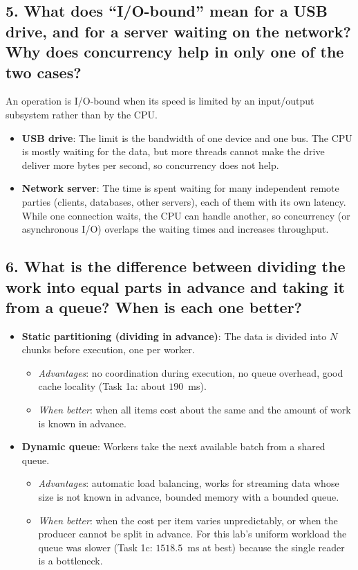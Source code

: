 \documentclass[11pt,a4paper]{article}
\begin{document}
\subsection{5. What does ``I/O-bound'' mean for a USB drive, and for a server waiting on the network? Why does concurrency help in only one of the two cases?}
An operation is I/O-bound when its speed is limited by an input/output subsystem rather than by the CPU.
\begin{itemize}
    \item \textbf{USB drive}: The limit is the bandwidth of one device and one bus. The CPU is mostly waiting for the data, but more threads cannot make the drive deliver more bytes per second, so concurrency does not help.
    \item \textbf{Network server}: The time is spent waiting for many independent remote parties (clients, databases, other servers), each of them with its own latency. While one connection waits, the CPU can handle another, so concurrency (or asynchronous I/O) overlaps the waiting times and increases throughput.
\end{itemize}

\subsection{6. What is the difference between dividing the work into equal parts in advance and taking it from a queue? When is each one better?}
\begin{itemize}
    \item \textbf{Static partitioning (dividing in advance)}: The data is divided into $N$ chunks before execution, one per worker.
    \begin{itemize}
        \item \textit{Advantages}: no coordination during execution, no queue overhead, good cache locality (Task 1a: about $190$~ms).
        \item \textit{When better}: when all items cost about the same and the amount of work is known in advance.
    \end{itemize}
    \item \textbf{Dynamic queue}: Workers take the next available batch from a shared queue.
    \begin{itemize}
        \item \textit{Advantages}: automatic load balancing, works for streaming data whose size is not known in advance, bounded memory with a bounded queue.
        \item \textit{When better}: when the cost per item varies unpredictably, or when the producer cannot be split in advance. For this lab's uniform workload the queue was slower (Task 1c: $1518.5$~ms at best) because the single reader is a bottleneck.
    \end{itemize}
\end{itemize}
\end{document}
